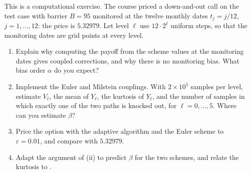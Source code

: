 \begin{exercise}\label{ex:ml-barrier}
\medium This is a computational exercise. The course priced a down-and-out call on the test case
with barrier $B=95$ monitored at the twelve monthly dates $t_j=j/12$, $j=1,\dots,12$: the price is
$5.32979$. Let level $\ell$ use $12\cdot2^\ell$ uniform steps, so that the monitoring dates are grid
points at every level.
\begin{enumerate}[label=(\alph*)]
  \item Explain why computing the payoff from the scheme values at the monitoring dates gives coupled
    corrections, and why there is no monitoring bias. What bias order $\alpha$ do you expect?
  \item Implement the Euler and Milstein couplings. With $2\times10^5$ samples per level, estimate
    $V_\ell$, the mean of $Y_\ell$, the kurtosis of $Y_\ell$, and the number of samples in which
    exactly one of the two paths is knocked out, for $\ell=0,\dots,5$. Where can you estimate $\beta$?
  \item Price the option with the adaptive algorithm and the Euler scheme to $\varepsilon=0.01$, and
    compare with $5.32979$.
  \item Adapt the argument of (ii) to predict $\beta$ for the two
    schemes, and relate the kurtosis to .
\end{enumerate}
\end{exercise}
